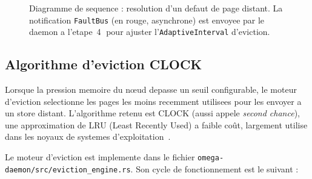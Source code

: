 \begin{figure}[htbp]
    \caption{Diagramme de sequence : resolution d'un defaut de page distant. La notification \texttt{FaultBus} (en rouge, asynchrone) est envoyee par le daemon a l'etape~\protect\textcircled{4} pour ajuster l'\texttt{AdaptiveInterval} d'eviction.}
    \label{fig:sequence-pagefault}
\end{figure}

\subsection{Algorithme d'eviction CLOCK}
\label{subsec:eviction-clock}

Lorsque la pression memoire du nœud depasse un seuil configurable, le moteur d'eviction selectionne les pages les moins recemment utilisees pour les envoyer a un store distant. L'algorithme retenu est CLOCK (aussi appele \textit{second chance}), une approximation de LRU (Least Recently Used) a faible coût, largement utilise dans les noyaux de systemes d'exploitation~\cite{tanenbaum_os}.

Le moteur d'eviction est implemente dans le fichier \texttt{omega-daemon/src/eviction\_engine.rs}. Son cycle de fonctionnement est le suivant :

